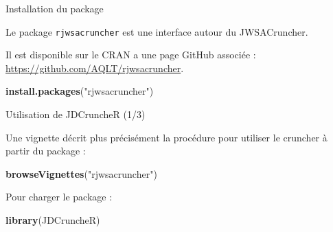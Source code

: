 \documentclass[10pt,xcolor=table,color={dvipsnames,usenames},ignorenonframetext,usepdftitle=false,french]{beamer}
\newenvironment{Shaded}{\begin{snugshade}}{\end{snugshade}}
\newcommand{\KeywordTok}[1]{\textcolor[rgb]{0.13,0.29,0.53}{\textbf{#1}}}
\newcommand{\NormalTok}[1]{#1}
\newcommand{\StringTok}[1]{\textcolor[rgb]{0.31,0.60,0.02}{#1}}
\begin{document}
\begin{frame}[fragile]{Installation du package}
\protect\hypertarget{installation-du-package}{}

Le package \texttt{rjwsacruncher} est une interface autour du
JWSACruncher.

Il est disponible sur le CRAN a une page GitHub associée :
\url{https://github.com/AQLT/rjwsacruncher}.

\begin{Shaded}
\begin{Highlighting}[]
\KeywordTok{install.packages}\NormalTok{(}\StringTok{"rjwsacruncher"}\NormalTok{)}
\end{Highlighting}
\end{Shaded}

\end{frame}

\begin{frame}[fragile]{Utilisation de JDCruncheR (1/3)}
\protect\hypertarget{utilisation-de-jdcruncher-13}{}

Une vignette décrit plus précisément la procédure pour utiliser le
cruncher à partir du package :

\begin{Shaded}
\begin{Highlighting}[]
\KeywordTok{browseVignettes}\NormalTok{(}\StringTok{"rjwsacruncher"}\NormalTok{)}
\end{Highlighting}
\end{Shaded}

Pour charger le package :

\begin{Shaded}
\begin{Highlighting}[]
\KeywordTok{library}\NormalTok{(JDCruncheR)}
\end{Highlighting}
\end{Shaded}

\end{frame}
\end{document}
